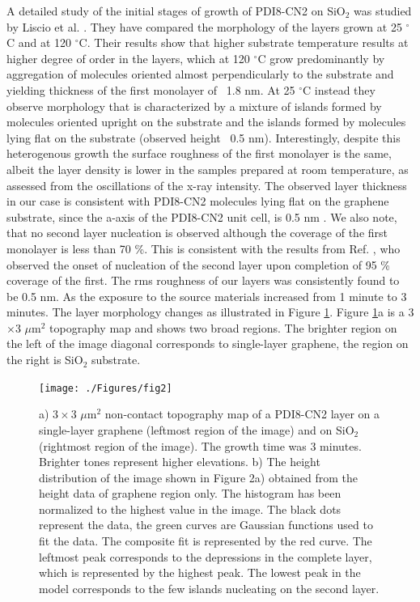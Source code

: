 \documentclass[preprint,aip,jap]{revtex4-2}
\begin{document}
 
A detailed study of the initial stages of growth of PDI8-CN2 on SiO$_{2}$ was studied by Liscio et al.
\cite{liscio-2013}.
 They have compared the morphology of the layers grown at 25 $^\circ$C and at 120 $^\circ$C.
 Their results show that higher substrate temperature results at higher degree of order in the layers, which at 120 $^\circ$C grow predominantly by aggregation of molecules oriented almost perpendicularly to the substrate and yielding thickness of the first monolayer of ~1.8 nm.
 At 25 $^\circ$C instead they observe morphology that is characterized by a mixture of islands formed by molecules oriented upright on the substrate and the islands formed by molecules lying flat on the substrate (observed height ~0.5 nm).
 Interestingly, despite this heterogenous growth the surface roughness of the first monolayer is the same, albeit the layer density is lower in the samples prepared at room temperature, as assessed from the oscillations of the x-ray intensity.
The observed layer thickness in our case is consistent with PDI8-CN2 molecules lying flat on the graphene substrate, since the a-axis of the PDI8-CN2 unit cell, is 0.5 nm \cite{liscio-2012}.
 We also note, that no second layer nucleation is observed although the coverage of the first monolayer is less than 70 \%.
 This is consistent with the results from Ref.
 , who observed the onset of nucleation of the second layer upon completion of 95 \% coverage of the first.
 The rms roughness of our layers was consistently found to be 0.5 nm.
 As the exposure to the source materials increased from 1 minute to 3 minutes.
 The layer morphology changes as illustrated in Figure \ref{fig:2}.
 Figure \ref{fig:2}a is a  3$\times$3 $\mu$m$^{2}$ topography map and shows two broad regions.
 The brighter region on the left of the image diagonal corresponds to single-layer graphene, the region on the right is SiO$_{2}$ substrate.
 
\begin{figure}[htb]
  \centering
   \texttt{[image: ./Figures/fig2]}
  \caption{a) $3\times3$ $\mu$m$^{2}$ non-contact topography map of a PDI8-CN2 layer on a single-layer graphene (leftmost region of the image) and on SiO$_{2}$ (rightmost region of the image).
 The growth time was 3 minutes.
 Brighter tones represent higher elevations.
 b) The height distribution of the image shown in Figure 2a) obtained from the height data of graphene region only.
 The histogram has been normalized to the highest value in the image.
 The black dots represent the data, the green curves are Gaussian functions used to fit the data.
 The composite fit is represented by the red curve.
  The leftmost peak corresponds to the depressions in the complete layer, which is represented by the highest peak.
 The lowest peak in the model corresponds to the few islands nucleating on the second layer.
}  \label{fig:2}
\end{figure}
\end{document}
